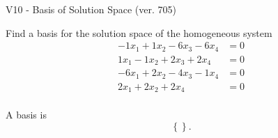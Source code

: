 \begin{exercise}
  \begin{exerciseTitle}V10 - Basis of Solution Space (ver. 705)\end{exerciseTitle}
  \begin{exerciseStatement}
    Find a basis for the solution space of the homogeneous system 
\begin{align*}
 -1 x_ 1 + 1 x_ 2 -6 x_ 3 -6 x_ 4 &= 0  \\ 
  1 x_ 1 -1 x_ 2 + 2 x_ 3 + 2 x_ 4 &= 0  \\ 
  -6 x_ 1 + 2 x_ 2 -4 x_ 3 -1 x_ 4 &= 0  \\ 
  2 x_ 1 + 2 x_ 2 + 2 x_ 4 &= 0  \\ 
 \end{align*}


 
  \end{exerciseStatement}

  \begin{exerciseAnswer}
   A basis is   
\[\left\{\right\}.\]

  


  \end{exerciseAnswer}
\end{exercise}